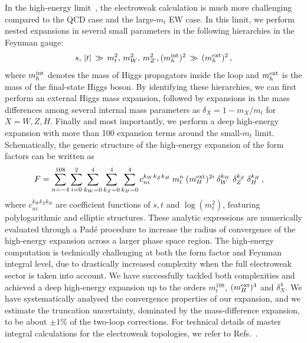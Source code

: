 In the high-energy limit~\cite{Davies:2026wbx},
the electroweak calculation is much more challenging compared to the QCD case and the large-$m_t$ EW case. In this limit, we perform nested expansions in several small parameters in the following hierarchies in the Feynman gauge:
\begin{align}
    s, \, |t| \,  \gg \, m_t^2, \, m_W^2, \, m_Z^2 \,, (m_h^{\rm int})^2 \, \gg \,  (m_h^{\rm ext})^2\,,
\end{align}
where $m_h^{\rm int}$ denotes the mass of Higgs propagators inside the loop and $m_h^{\rm ext}$ is the mass of the final-state Higgs boson.
%
By identifying these hierarchies, we can first perform an external Higgs mass expansion, followed by expansions in the mass differences among several internal mass parameters as $\delta_X = 1 - m_X/ m_t $ for $ X=W,Z,H$.
Finally and most importantly, we perform a deep high-energy expansion with more than 100 expansion terms around the small-$m_t$ limit.
%
Schematically, the generic structure of the high-energy expansion of the form factors can be written as
\begin{align}
  F &= \sum_{n=-4}^{108} \sum_{i=0}^{2} \sum_{k_W=0}^{{4}}\sum_{k_Z=0}^{{4}}\sum_{k_H=0}^{{4}} 
        c_{ni}^{k_W k_Z k_H}  \: m_t^{n} \:
        (m^{\rm ext}_H)^{2i} \:
        \delta_W^{k_W} \: \delta_Z^{k_Z} \: \delta_H^{k_H} 
        \,,
\end{align}
where $c_{ni}^{k_W k_Z k_H}$ are coefficient functions of $s,t$ and $\log(m_t^2)$, featuring polylogarithmic and elliptic structures.
%
These analytic expressions are numerically evaluated through a Pad\'{e} procedure to increase the radius of convergence of the high-energy expansion across a larger phase space region.
%
The high-energy computation is technically challenging at both the form factor and Feynman integral level, due to drastically increased complexity when the full electroweak sector is taken into account.
%
We have successfully tackled both complexities and achieved a deep high-energy expansion up to the orders $m_t^{108}$, $(m_{H}^{\rm ext})^4$ and $\delta_X^4$. 
We have systematically analysed the convergence properties of our expansion, and we estimate the truncation uncertainty, dominated by the mass-difference expansion, to be about $\pm 1\%$ of the two-loop corrections.
%
For technical details of master integral calculations for the electroweak topologies, we refer to Refs.~\cite{Davies:2025wke,Davies:2022ram,Zhang:2024fcu}.



